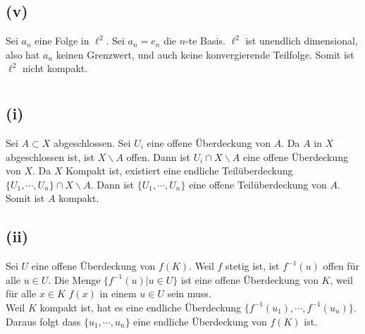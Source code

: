 \documentclass[]{scrartcl}
\begin{document}
\subsection{(v)}
Sei $a_n$ eine Folge in $\ell^2$. Sei $a_n = e_n$ die $n$-te Basis. $\ell^2$ ist unendlich 
dimensional, also hat $a_n$ keinen Grenzwert, und auch keine konvergierende Teilfolge. 
Somit ist $\ell^2$ nicht kompakt.

\section{}

\subsection{(i)}
Sei $A\subset X$ abgeschlossen. Sei $U_i$ eine offene Überdeckung von $A$. Da $A$ in $X$ abgeschlossen ist, ist $X\backslash A$ offen. Dann ist $U_i \cap X\backslash A$ eine offene Überdeckung von $X$. Da $X$ Kompakt ist, existiert eine endliche Teilüberdeckung $\{U_1,\cdots, U_n\}\cap X\backslash A$.
Dann ist $\{U_1,\cdots, U_n\}$ eine offene Teilüberdeckung von $A$. Somit ist $A$ kompakt.

\subsection{(ii)}

Sei $U$ eine offene Überdeckung von $f(K)$. Weil $f$ stetig ist, ist $f^{-1}(u)$ offen für alle $u\in U$.
Die Menge $\{f^{-1}(u)| u\in U\}$ ist eine offene Überdeckung von $K$, 
weil für alle $x\in K$ $f(x)$ in einem $u\in U$ sein muss.\\
Weil $K$ kompakt ist, hat es eine endliche Überdeckung $\{f^{-1}(u_1), \cdots, f^{-1}(u_n)\}$.
Daraus folgt dass $\{u_1, \cdots, u_n\}$ eine endliche Überdeckung von $f(K)$ ist.
\end{document}
